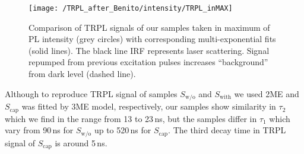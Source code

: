 
\begin{figure}[!ht]
	\centering
	\texttt{[image: /TRPL\_after\_Benito/intensity/TRPL\_inMAX]}
	\caption{Comparison of TRPL signals of our samples taken in maximum of PL intensity (grey circles) with corresponding multi-exponential fits (solid lines). The black line IRF represents laser scattering. Signal repumped from previous excitation pulses increases \enquote{background} from dark level (dashed line).}
	\label{fig:TRPL_int_all_max}
\end{figure}

%
%

%
Although to reproduce TRPL signal of samples $S_\mathrm{w/o}$ and $S_\mathrm{with}$ we used 2ME and $S_\mathrm{cap}$ was fitted by 3ME model, respectively, our samples show similarity in $\tau_2$ which we find in the range from 13 to 23$\,$ns, but the samples differ in $\tau_1$ which vary from 90$\,$ns for $S_\mathrm{w/o}$ up to 520$\,$ns for $S_\mathrm{cap}$. The third decay time in TRPL signal of $S_\mathrm{cap}$ is around 5$\,$ns.

